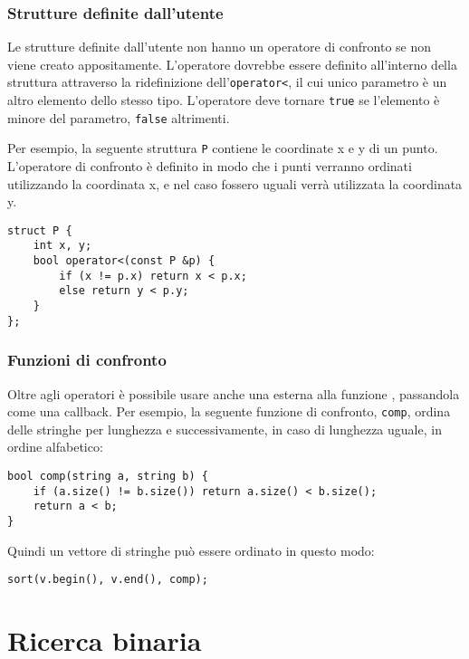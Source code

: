 \subsubsection{Strutture definite dall'utente}

Le strutture definite dall'utente non hanno
un operatore di confronto se non viene creato appositamente.
L'operatore dovrebbe essere definito all'interno 
della struttura attraverso la ridefinizione dell'\texttt{operator<},
il cui unico parametro è un altro elemento dello stesso tipo.
L'operatore deve tornare \texttt{true}
se l'elemento è minore del parametro,
\texttt{false} altrimenti.

Per esempio, la seguente struttura \texttt{P}
contiene le coordinate x e y di un punto.
L'operatore di confronto è definito in modo che i 
punti verranno ordinati utilizzando la coordinata x,
e nel caso fossero uguali verrà utilizzata la coordinata y.

\begin{lstlisting}
struct P {
    int x, y;
    bool operator<(const P &p) {
        if (x != p.x) return x < p.x;
        else return y < p.y;
    }
};
\end{lstlisting}

\subsubsection{Funzioni di confronto}


Oltre agli operatori è possibile usare anche una
 esterna
alla funzione , passandola come una callback. 
Per esempio, la seguente funzione di confronto, \texttt{comp},
ordina delle stringhe per lunghezza e successivamente, in caso di 
lunghezza uguale, in ordine alfabetico:

\begin{lstlisting}
bool comp(string a, string b) {
    if (a.size() != b.size()) return a.size() < b.size();
    return a < b;
}
\end{lstlisting}
Quindi un vettore di stringhe può essere ordinato 
in questo modo:
\begin{lstlisting}
sort(v.begin(), v.end(), comp);
\end{lstlisting}

\section{Ricerca binaria}

